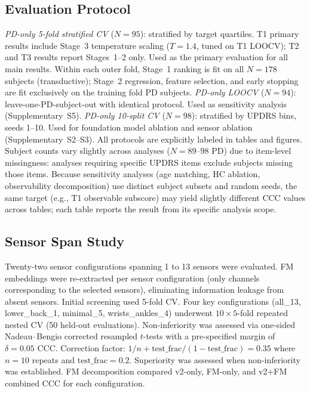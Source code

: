 \documentclass[11pt,a4paper]{article}
\begin{document}
\subsection{Evaluation Protocol}

\emph{PD-only 5-fold stratified CV} ($N=95$): stratified by target quartiles. T1 primary results include Stage~3 temperature scaling ($T=1.4$, tuned on T1 LOOCV); T2 and T3 results report Stages~1--2 only. Used as the primary evaluation for all main results. Within each outer fold, Stage~1 ranking is fit on all $N=178$ subjects (transductive); Stage~2 regression, feature selection, and early stopping are fit exclusively on the training fold PD subjects. \emph{PD-only LOOCV} ($N=94$): leave-one-PD-subject-out with identical protocol. Used as sensitivity analysis (Supplementary~S5). \emph{PD-only 10-split CV} ($N=98$): stratified by UPDRS bins, seeds 1--10. Used for foundation model ablation and sensor ablation (Supplementary~S2--S3). All protocols are explicitly labeled in tables and figures. Subject counts vary slightly across analyses ($N=89$--$98$ PD) due to item-level missingness: analyses requiring specific UPDRS items exclude subjects missing those items. Because sensitivity analyses (age matching, HC ablation, observability decomposition) use distinct subject subsets and random seeds, the same target (e.g., T1 observable subscore) may yield slightly different CCC values across tables; each table reports the result from its specific analysis scope.

\subsection{Sensor Span Study}

Twenty-two sensor configurations spanning 1 to 13 sensors were evaluated. FM embeddings were re-extracted per sensor configuration (only channels corresponding to the selected sensors), eliminating information leakage from absent sensors. Initial screening used 5-fold CV. Four key configurations (all\_13, lower\_back\_1, minimal\_5, wrists\_ankles\_4) underwent $10\times 5$-fold repeated nested CV (50 held-out evaluations). Non-inferiority was assessed via one-sided Nadeau--Bengio corrected resampled $t$-tests with a pre-specified margin of $\delta=0.05$ CCC. Correction factor: $1/n + \text{test\_frac}/(1-\text{test\_frac})=0.35$ where $n=10$ repeats and $\text{test\_frac}=0.2$. Superiority was assessed when non-inferiority was established. FM decomposition compared v2-only, FM-only, and v2+FM combined CCC for each configuration.
\end{document}
